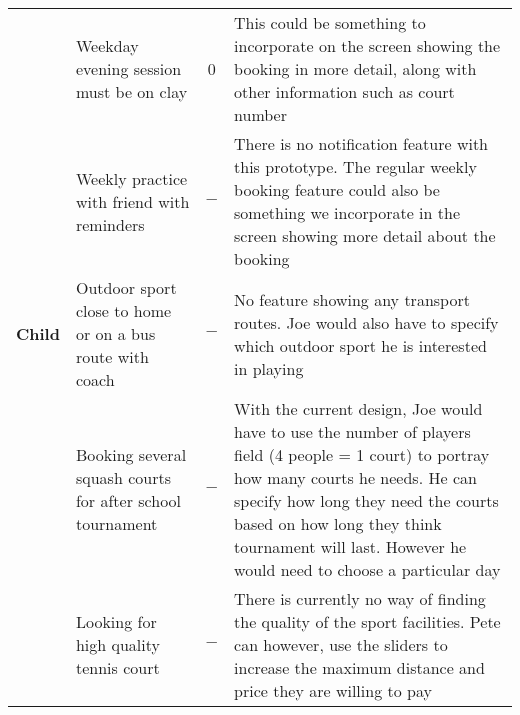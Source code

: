\begin{center}
\begin{longtable}{p{} p{} c p{}}
		& Weekday evening session must be on clay & 0 & This could be something
		to incorporate on the screen showing the booking in more detail, along
		with other information such as court number \\

		& Weekly practice with friend with reminders & $-$ & There is no
		notification feature with this prototype. The regular weekly booking
		feature could also be something we incorporate in the screen showing
		more detail about the booking \\

		\midrule
		\textbf{Child} & Outdoor sport close to home or on a bus route with
		coach & $-$ & No feature showing any transport routes. Joe would also
		have to specify which outdoor sport he is interested in playing \\

		& Booking several squash courts for after school tournament & $-$ & With
		the current design, Joe would have to use the number of players field
		(4 people = 1 court) to portray how many courts he needs. He can
		specify how long they need the courts based on how long they think
		tournament will last. However he would need to choose a particular day
		\\

		& Looking for high quality tennis court & $-$ & There is currently no way
		of finding the quality of the sport facilities. Pete can however, use
		the sliders to increase the maximum distance and price they are willing
		to pay \\
		\bottomrule
	\end{longtable}
\end{center}
\restoregeometry%
